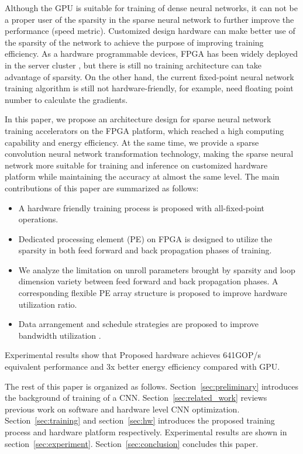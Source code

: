 Although the GPU is suitable for training of dense neural networks, it can not be a proper user of the sparsity in the sparse neural network to further improve the performance (speed metric). Customized design hardware can make better use of the sparsity of the network to achieve the purpose of improving training efficiency. As a hardware programmable devices, FPGA has been widely deployed in the server cluster \cite{RN169, RN171, RN172}, but there is still no training architecture can take advantage of sparsity. On the other hand, the current fixed-point neural network training algorithm is still not hardware-friendly, for example, need floating point number to calculate the gradients\cite{Zhou2016DoReFa}.

In this paper, we propose an architecture design for sparse neural network training accelerators on the FPGA platform, which reached a high computing capability and energy efficiency. At the same time, we provide a sparse convolution neural network transformation technology, making the sparse neural network more suitable for training and inference on customized hardware platform while maintaining the accuracy at almost the same level. The main contributions of this paper are summarized as follows:
\begin{itemize}
\item A hardware friendly training process is proposed with all-fixed-point operations. 
\item Dedicated processing element (PE) on FPGA is designed to utilize the sparsity in both feed forward and back propagation phases of training.
\item We analyze the limitation on unroll parameters brought by sparsity and loop dimension variety between feed forward and back propagation phases. A corresponding flexible PE array structure is proposed to improve hardware utilization ratio.
\item Data arrangement and schedule strategies are proposed to improve bandwidth utilization .
\end{itemize}
Experimental results show that Proposed hardware achieves 641GOP/s equivalent performance and 3x better energy efficiency compared with GPU. 

The rest of this paper is organized as follows. Section~\ref{sec:preliminary} introduces the background of training of a CNN. Section~\ref{sec:related_work} reviews previous work on software and hardware level CNN optimization. Section~\ref{sec:training} and section~\ref{sec:hw} introduces the proposed training process and hardware platform respectively. Experimental results are shown in section~\ref{sec:experiment}. Section~\ref{sec:conclusion} concludes this paper.
